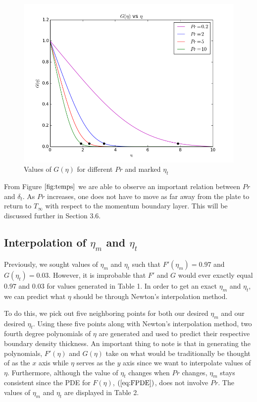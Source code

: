 \documentclass[12pt]{article}\pagestyle{myheadings}
\theoremstyle{plain}
\begin{document}
\begin{figure}[ht!]
\centering
\includegraphics[scale=0.75]{Gs.png}
\caption{Values of $G(\eta)$ for different $Pr$ and marked $\eta_{t}$}
\label{fig:temps}
\end{figure}

From Figure $\ref{fig:temps}$ we are able to observe an important relation between $Pr$ and $\delta_{t}$. As $Pr$ increases, one does not have to move as far away from the plate to return to $T_{\infty}$ with respect to the momentum boundary layer. This will be discussed further in Section 3.6.

\subsection{Interpolation of $\eta_{m}$ and $\eta_{t}$}
Previously, we sought values of $\eta_{m}$ and $\eta_{t}$ such that $F'(\eta_{m}) = 0.97$ and $G(\eta_{t}) = 0.03$. However, it is improbable that $F'$ and $G$ would ever exactly equal $0.97$ and $0.03$ for values generated in Table 1. In order to get an exact $\eta_{m}$ and $\eta_{t}$, we can predict what $\eta$ should be through Newton's interpolation method.\vspace{5mm}

To do this, we pick out five neighboring points for both our desired $\eta_{m}$ and our desired $\eta_{t}$. Using these five points along with Newton's interpolation method, two fourth degree polynomials of $\eta$ are generated and used to predict their respective boundary density thickness. An important thing to note is that in generating the polynomials, $F'(\eta)$ and $G(\eta)$ take on what would be traditionally be thought of as the $x$ axis while $\eta$ serves as the $y$ axis since we want to interpolate values of $\eta$. Furthermore, although the value of $\eta_{t}$ changes when $Pr$ changes, $\eta_{m}$ stays consistent since the PDE for $F(\eta)$, $(\ref{eq:FPDE})$, does not involve $Pr$. The values of $\eta_{m}$ and $\eta_{t}$ are displayed in Table 2.
\end{document}
